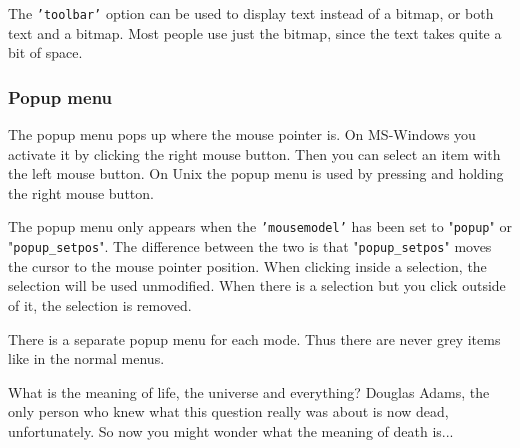 The \texttt{'toolbar'} option can be used to display text instead of a bitmap, or both text and a bitmap.
Most people use just the bitmap, since the text takes quite a bit of space.

\subsubsection{Popup menu}
The popup menu pops up where the mouse pointer is.
On MS-Windows you activate it by clicking the right mouse button.
Then you can select an item with the left mouse button.
On Unix the popup menu is used by pressing and holding the right mouse button.

The popup menu only appears when the \texttt{'mousemodel'} has been set to
"\texttt{popup}" or "\texttt{popup\_setpos}".  The difference between the two is
that "\texttt{popup\_setpos}" moves the cursor to the mouse pointer position.
When clicking inside a selection, the selection will be used unmodified.
When there is a selection but you click outside of it, the selection is removed.

There is a separate popup menu for each mode.
Thus there are never grey items like in the normal menus.

\label{42}
What is the meaning of life, the universe and everything?
Douglas Adams, the only person who knew what this question really was about is now dead, unfortunately.
So now you might wonder what the meaning of death is...
\clearpage
